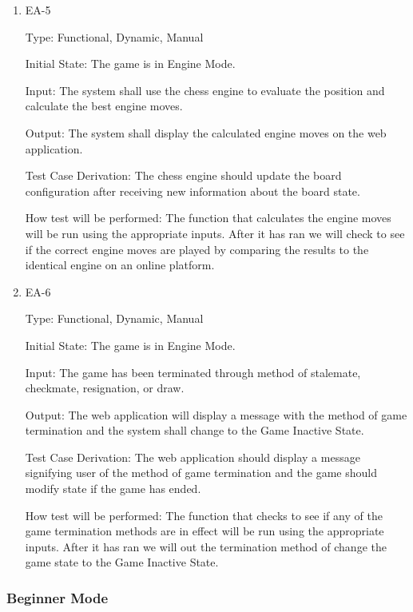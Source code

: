 \documentclass[12pt, titlepage]{article}
\begin{document}
\begin{enumerate}
    \item{EA-5\\}

    Type: Functional, Dynamic, Manual
                      
    Initial State: The game is in Engine Mode.
                        
    Input: The system shall use the chess engine to evaluate the position and calculate the best
    engine moves.
                        
    Output: The system shall display the calculated engine moves on the web application.
                        
    Test Case Derivation: The chess engine should update the board configuration after receiving new information about the board state. 

    How test will be performed: The function that calculates the engine moves
    will be run using the appropriate inputs. After it has ran we will check to see if the correct engine moves are played
    by comparing the results to the identical engine on an online platform.

    \item{EA-6\\}

    Type: Functional, Dynamic, Manual
                      
    Initial State: The game is in Engine Mode.
                        
    Input: The game has been terminated through method of stalemate, checkmate, resignation, or draw.
                        
    Output: The web application will display a message with the method of game termination and the
    system shall change to the Game Inactive State.
                        
    Test Case Derivation: The web application should display a message signifying user of the method of game termination
    and the game should modify state if the game has ended.

    How test will be performed: The function that checks to see if any of the game termination methods are in effect
    will be run using the appropriate inputs. After it has ran we will out the termination method of change the
    game state to the Game Inactive State.

  \end{enumerate}
   
  \subsubsection{Beginner Mode}
\end{document}
